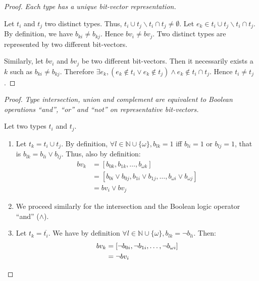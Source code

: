 \documentclass[format=sigconf]{acmart}
\theoremstyle{definition}
\begin{document}
\newcommand{\reldiff}[2]{#1 \cup #2 \backslash #1 \cap #2}

\begin{proof}
  \emph{\small Each type has a unique bit-vector representation.}

  Let $t_i$ and $t_j$ two distinct types. Thus, $\reldiff{t_i}{t_j} \neq \emptyset$.
  Let $e_k \in \reldiff{t_i}{t_j}$. By definition, we have $b_{ki} \neq b_{kj}$.
  Hence $bv_i \neq bv_j$. Two distinct types are represented by two different
  bit-vectors.

  Similarly, let $bv_i$ and $bv_j$ be two different bit-vectors. Then it
  necessarily exists a $k$ such as $b_{ki} \neq b_{kj}$. Therefore
  $\exists e_k, \left(e_k \notin t_i \vee e_k \notin t_j\right) \wedge e_k
  \notin t_i \cap t_j$. Hence $t_i \neq t_j$. \qedhere
\end{proof}

\begin{proof}
  \emph{\small Type intersection, union and complement are equivalent to Boolean
    operations ``and'', ``or'' and ``not'' on representative bit-vectors.}

  Let two types $t_i$ and $t_j$.
  \begin{enumerate}
  \item Let $t_k = t_i \cup t_j$. By definition, $\forall l \in \mathbb{N} \cup
    \{\omega\}, b_{lk} = 1$ iff $b_{li} = 1$ or $b_{lj} = 1$, that is $b_{lk} =
    b_{li} \vee b_{lj}$. Thus, also by definition:
    \begin{align*}
      bv_k &= \left[b_{0k}, b_{1k}, \dots, b_{\omega k}\right]  \\
           &= \left[b_{0i} \vee b_{0j}, b_{1i} \vee b_{1j}, \dots, b_{\omega i} \vee b_{\omega j}\right]  \\
           &= bv_i \vee bv_j
    \end{align*}
  \item We proceed similarly for the intersection and the Boolean logic operator
    ``and'' ($\wedge$).
  \item Let $t_k = \overline{t_i}$. We have by definition $\forall l \in
    \mathbb{N} \cup \{\omega\}, b_{lk} = \neg b_{li}$. Then:
    \begin{align*}
      bv_k &= \left[\neg b_{0i}, \neg b_{1i}, \dots, \neg b_{\omega i}\right]  \\
           &= \neg bv_i \qedhere
    \end{align*}
  \end{enumerate}
\end{proof}
\end{document}
